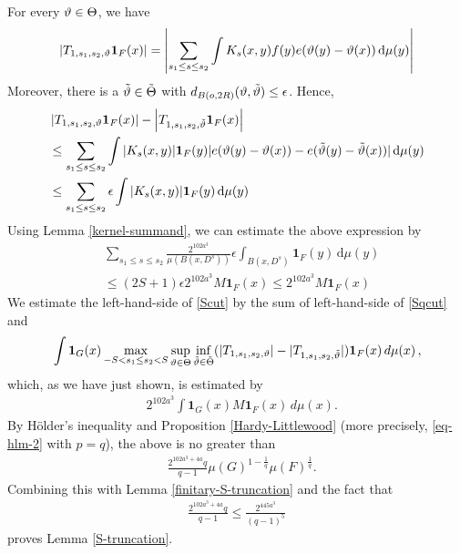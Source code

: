 For every ${\vartheta}\in {\Theta}$, we have
\begin{equation}
\left| T_{1, s_1,s_2,{\vartheta}} \mathbf{1}_{F}(x)\right|=
\left|\sum_{s_1 \le s\le s_2}
\int K_s(x,y)  f(y) e({\vartheta}(y)-{{\vartheta}(x)}) \, \mathrm{d}\mu(y)\right|
\end{equation}
Moreover, there is a $\tilde{{\vartheta}}
\in \tilde{{\Theta}}$ with $d_{B(o,2R)}({\vartheta},\tilde{{\vartheta}})\le \epsilon$. Hence,
\begin{align*}
    &\left| T_{1, s_1,s_2,{\vartheta}} \mathbf{1}_{F}(x)\right|-\left|T_{1, s_1,s_2,\tilde{{\vartheta}}} \mathbf{1}_{F}(x) \right|\\
  &\leq\sum_{s_1 \le s\le s_2} \int |K_s(x,y)|  \mathbf{1}_F(y) |e({\vartheta}(y)-{{\vartheta}(x)})-e({\tilde{{\vartheta}}(y)}-{\tilde{{\vartheta}}(x)})| \, \mathrm{d}\mu(y)\\
    &\leq \sum_{s_1 \le s\le s_2} \epsilon \int |K_s(x,y)|  \mathbf{1}_F(y) \, \mathrm{d}\mu(y)
\end{align*}
Using Lemma \ref{kernel-summand}, we can estimate the above expression by
\begin{align*}
    &\sum_{s_1 \le s\le s_2} \frac{2^{102 a^3}}{\mu(B(x, D^{s}))}
\epsilon \int_{B(x, D^s)} \mathbf{1}_F(y)  \, \mathrm{d}\mu(y)\\
    &\leq (2S+1)\epsilon 2^{102 a^3} M\mathbf{1}_F(x)\le 2^{102 a^3}M\mathbf{1}_F(x)
\end{align*}
We estimate the left-hand-side of \eqref{Scut} by
the sum of left-hand-side of \eqref{Sqcut} and
\begin{align*}
    &\int \mathbf{1}_{G}(x)
\max_{-S<s_1\le s_2<S}\sup_{{\vartheta}\in {{\Theta}}}
\inf_{\tilde{{\vartheta}}\in\tilde{{\Theta}}}
(| T_{1, s_1,s_2,{\vartheta}}|-|T_{1, s_1,s_2,\tilde{{\vartheta}}}  |)\mathbf{1}_{F}(x)\, d\mu(x)\,,\\
\end{align*}
which, as we have just shown, is estimated by
\begin{align*}
     &2^{102 a^3}\int \mathbf{1}_{G}(x)
M\mathbf{1}_{F}(x)\, d\mu(x).
\end{align*}
By Hölder's inequality and Proposition \ref{Hardy-Littlewood}
 (more precisely, \eqref{eq-hlm-2} with $p=q$), the above is no greater than
\begin{align*}
&\frac{2^{102 a^3+4a}q}{q-1} \mu(G)^{1-\frac{1}{q}} \mu(F)^{\frac{1}{q}}.
\end{align*}
Combining this with Lemma \ref{finitary-S-truncation} and the fact that
\begin{align*}
    \frac{2^{102 a^3+4a}q}{q-1}\leq \frac{2^{445a^3}}{(q-1)^5}
\end{align*}
proves Lemma \ref{S-truncation}.

